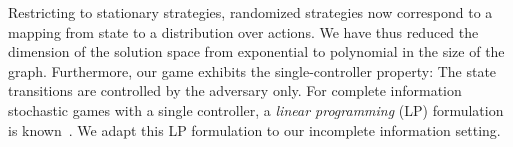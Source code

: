 Restricting to stationary strategies,  randomized strategies now correspond to a mapping from state to a distribution over actions. We have thus reduced the dimension of the solution space from exponential to polynomial in the size of the graph.
Furthermore, our game exhibits the single-controller property: The state transitions are controlled by the adversary only. For complete information stochastic games with a single controller, a \emph{linear programming} (LP) formulation is known~\cite{Raghavan2003}. We adapt this LP formulation to our incomplete information setting.
 
